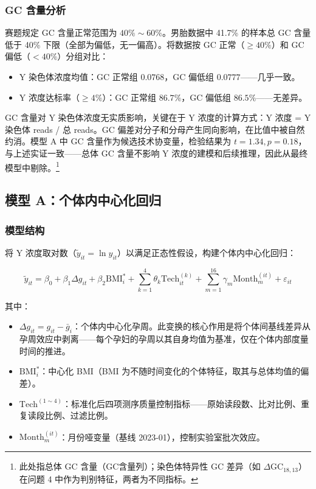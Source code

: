 \documentclass{mcm-paper}
\begin{document}
\subsubsection{GC 含量分析}

赛题规定 GC 含量正常范围为 $40\%\sim60\%$。男胎数据中 41.7\% 的样本总 GC 含量低于 40\% 下限（全部为偏低，无一偏高）。将数据按 GC 正常（$\geq 40\%$）和 GC 偏低（$<40\%$）分组对比：

\begin{itemize}
    \item Y 染色体浓度均值：GC 正常组 $0.0768$，GC 偏低组 $0.0777$——几乎一致。
    \item Y 浓度达标率（$\geq 4\%$）：GC 正常组 $86.7\%$，GC 偏低组 $86.5\%$——无差异。
\end{itemize}

GC 含量对 Y 染色体浓度无实质影响，关键在于 Y 浓度的计算方式：Y 浓度 = Y 染色体 reads / 总 reads。GC 偏差对分子和分母产生同向影响，在比值中被自然约消。模型 A 中 GC 含量作为候选技术协变量，检验结果为 $t=1.34, p=0.18$，与上述实证一致——总体 GC 含量不影响 Y 浓度的建模和后续推理，因此从最终模型中剔除。\footnote{此处指总体 GC 含量（GC含量列）；染色体特异性 GC 差异（如 $\Delta$GC$_{18,13}$）在问题 4 中作为判别特征，两者为不同指标。}

\subsection{模型 A：个体内中心化回归}

\subsubsection{模型结构}

将 Y 浓度取对数（$\tilde{y}_{it}=\ln y_{it}$）以满足正态性假设，构建个体内中心化回归：

\begin{equation}
\tilde{y}_{it} = \beta_0 + \beta_1 \Delta g_{it} + \beta_2 \mathrm{BMI}_i^* + \sum_{k=1}^{4} \theta_k \mathrm{Tech}_{it}^{(k)} + \sum_{m=1}^{16} \gamma_m \mathrm{Month}_m^{(it)} + \varepsilon_{it}
\label{eq:modelA}
\end{equation}

其中：
\begin{itemize}
    \item $\Delta g_{it} = g_{it} - \bar{g}_i$：个体内中心化孕周。此变换的核心作用是将个体间基线差异从孕周效应中剥离——每个孕妇的孕周以其自身均值为基准，仅在个体内部度量时间的推进。
    \item $\mathrm{BMI}_i^*$：中心化 BMI（BMI 为不随时间变化的个体特征，取其与总体均值的偏差）。
    \item $\mathrm{Tech}^{(1\sim4)}$：标准化后四项测序质量控制指标——原始读段数、比对比例、重复读段比例、过滤比例。
    \item $\mathrm{Month}_m^{(it)}$：月份哑变量（基线 2023-01），控制实验室批次效应。
\end{itemize}
\end{document}
